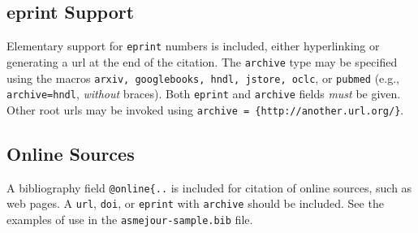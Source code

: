\documentclass[subscriptcorrection,upint,varvw,mathalfa=cal=euler,barcolor=black,balance,hyphenate,french,pdf-a,nolists]{asmejour}
\begin{document}


\begin{table}[t]
\caption{Table with more complicated columns}\label{tab:2}%
%
\end{table}


\subsection{eprint Support} Elementary support for \texttt{eprint} numbers is included, either hyperlinking or generating a url at the end of the citation. The \texttt{archive} type may be specified using the macros \texttt{arxiv, googlebooks, hndl, jstore, oclc}, or \texttt{pubmed} (e.g., \texttt{archive=hndl},  \textit{without} braces). Both \texttt{eprint} and \texttt{archive} fields \textit{must} be given. Other root urls may be invoked using \verb|archive = {http://another.url.org/}|.

\subsection{Online Sources} A bibliography field \verb|@online{..| is included for citation of online sources, such as web pages. A \texttt{url}, \texttt{doi}, or \texttt{eprint} with \texttt{archive} should be included. See the examples of use in the \texttt{asmejour-sample.bib} file.
\end{document}

